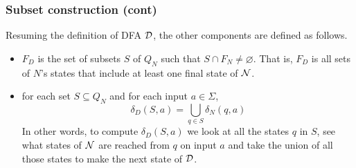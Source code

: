 % 
\begin{frame}
\frametitle{Subset construction (cont)}

Resuming the definition of DFA \({\cal D}\), the other components are
defined as follows.

\begin{itemize}

  \item \(F_D\) is the set of subsets \(S\) of \(Q_N\) such that \(S
    \cap F_N \neq \varnothing\). That is, \(F_D\) is all sets of
    \(N\)'s states that include at least one final state of \({\cal
      N}\).

  \item for each set \(S \subseteq Q_N\) and for each input \(a \in
  \Sigma\),
  \[
    \delta_D(S, a) = \bigcup_{q \in S}{\delta_N (q, a)}
  \]
  In other words, to compute \(\delta_D (S, a)\) we look at all the
  states \(q\) in \(S\), see what states of \({\cal N}\) are reached
  from \(q\) on input \(a\) and take the union of all those states to
  make the next state of \({\cal D}\).

\end{itemize}

\end{frame}

